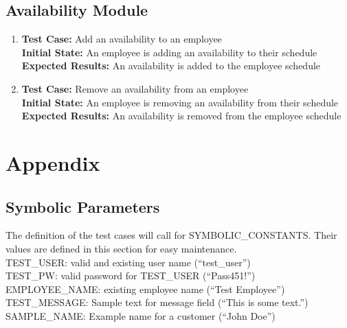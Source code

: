 \documentclass[12pt, titlepage]{article}
\begin{document}
\subsection{Availability Module}
\begin{enumerate}
    \item \textbf{Test Case:} Add an availability to an employee \\
    \textbf{Initial State:} An employee is adding an availability to their schedule \\
    \textbf{Expected Results:} An availability is added to the employee schedule
    
    \item \textbf{Test Case:} Remove an availability from an employee \\
    \textbf{Initial State:} An employee is removing an availability from their schedule \\
    \textbf{Expected Results:} An availability is removed from the employee schedule
\end{enumerate}

				




\newpage

\section{Appendix}

\subsection{Symbolic Parameters}

The definition of the test cases will call for SYMBOLIC\_CONSTANTS.
Their values are defined in this section for easy maintenance.\\

TEST\_USER: valid and existing user name (``test\_user'')\\

TEST\_PW: valid password for TEST\_USER (``Pass451!'')\\

EMPLOYEE\_NAME: existing employee name (``Test Employee'')\\ 

TEST\_MESSAGE: Sample text for message field (``This is some text.'')\\

SAMPLE\_NAME: Example name for a customer (``John Doe'')\\
\end{document}
